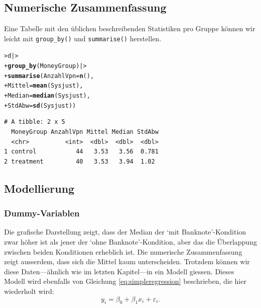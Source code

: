 \documentclass[oneside, 10pt]{book}\usepackage[]{graphicx}\usepackage[]{xcolor}
\makeatletter
\newcommand{\hlstd}[1]{\textcolor[rgb]{0.345,0.345,0.345}{#1}}%
\newcommand{\hlkwc}[1]{\textcolor[rgb]{0.333,0.667,0.333}{#1}}%
\newcommand{\hlkwd}[1]{\textcolor[rgb]{0.737,0.353,0.396}{\textbf{#1}}}%
\newenvironment{kframe}{%
 \def\at@end@of@kframe{}%
 \ifinner\ifhmode%
  \def\at@end@of@kframe{\end{minipage}}%
  \begin{minipage}{\columnwidth}%
 \fi\fi%
 \def\FrameCommand##1{\hskip\@totalleftmargin \hskip-\fboxsep
 \colorbox{shadecolor}{##1}\hskip-\fboxsep
     \hskip-\linewidth \hskip-\@totalleftmargin \hskip\columnwidth}%
 \MakeFramed {\advance\hsize-\width
   \@totalleftmargin\z@ \linewidth\hsize
   \@setminipage}}%
 {\par\unskip\endMakeFramed%
 \at@end@of@kframe}
\newenvironment{knitrout}{}{} %
\makeatother
\begin{document}
\subsection{Numerische Zusammenfassung}
Eine Tabelle mit den üblichen beschreibenden Statistiken pro Gruppe
können wir leicht mit \texttt{group\_by()} und \texttt{summarise()} herstellen.

\begin{knitrout}
\color{fgcolor}\begin{kframe}
\begin{alltt}
\hlstd{> }\hlstd{d |>}
\hlstd{+ }  \hlkwd{group_by}\hlstd{(MoneyGroup) |>}
\hlstd{+ }  \hlkwd{summarise}\hlstd{(}\hlkwc{AnzahlVpn} \hlstd{=} \hlkwd{n}\hlstd{(),}
\hlstd{+ }            \hlkwc{Mittel} \hlstd{=} \hlkwd{mean}\hlstd{(Sysjust),}
\hlstd{+ }            \hlkwc{Median} \hlstd{=} \hlkwd{median}\hlstd{(Sysjust),}
\hlstd{+ }            \hlkwc{StdAbw} \hlstd{=} \hlkwd{sd}\hlstd{(Sysjust))}
\end{alltt}
\begin{verbatim}
# A tibble: 2 x 5
  MoneyGroup AnzahlVpn Mittel Median StdAbw
  <chr>          <int>  <dbl>  <dbl>  <dbl>
1 control           44   3.53   3.56  0.781
2 treatment         40   3.53   3.94  1.02 
\end{verbatim}
\end{kframe}
\end{knitrout}


\subsection{Modellierung}\label{sec:money_model}
\subsubsection{Dummy-Variablen}
Die grafische Darstellung zeigt, dass der Median der `mit Banknote'-Kondition
zwar höher ist als jener der `ohne Banknote'-Kondition, aber das die
Überlappung zwischen beiden Konditionen erheblich ist.
Die numerische Zusammenfassung zeigt ausserdem, dass sich die Mittel kaum unterscheiden.
Trotzdem können wir diese Daten---ähnlich wie im letzten Kapitel---in ein Modell giessen.
Dieses Modell wird ebenfalls von Gleichung \vref{eq:simpleregression} beschrieben, die hier wiederholt wird:
\begin{equation}
y_i = \beta_0 + \beta_1 x_i + \varepsilon_i.
\end{equation}
\end{document}

